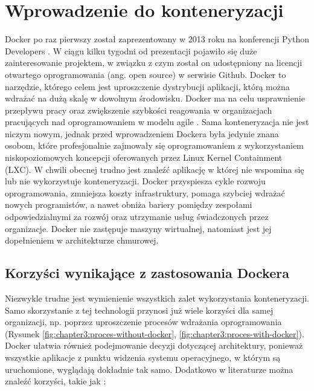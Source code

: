 \section{Wprowadzenie do konteneryzacji}
\label{sec:docker}
Docker po raz pierwszy został zaprezentowany w 2013 roku na konferencji Python Developers \cite{bernstein2014containers}. W ciągu kilku tygodni od prezentacji pojawiło się duże zainteresowanie projektem, w związku z czym został on udostępniony na licencji otwartego oprogramowania (ang. open source) w serwisie Github. Docker to narzędzie, którego celem jest uproszczenie dystrybucji aplikacji, którą można wdrażać na dużą skalę w dowolnym środowisku. Docker ma na celu usprawnienie przepływu pracy oraz zwiększenie szybkości reagowania w organizacjach pracujących nad oprogramowaniem w modelu agile \cite{panthofer2019mastering}. Sama konteneryzacja nie jest niczym nowym, jednak przed wprowadzeniem Dockera \cite{anderson2015docker} była jedynie znana osobom, które profesjonalnie zajmowały się oprogramowaniem z wykorzystaniem niskopoziomowych koncepcji oferowanych przez Linux Kernel Containment (LXC). W chwili obecnej trudno jest znaleźć aplikację w której nie wspomina się lub nie wykorzystuje konteneryzacji. Docker przyspiesza cykle rozwoju oprogramowania, zmniejsza koszty infrastruktury, pomaga szybciej wdrażać nowych programistów, a nawet obniża bariery pomiędzy zespołami odpowiedzialnymi za rozwój oraz utrzymanie usług świadczonych przez organizacje. Docker nie zastępuje maszyny wirtualnej, natomiast jest jej dopełnieniem w architekturze chmurowej.


\subsection{Korzyści wynikające z zastosowania Dockera}
Niezwykle trudne jest wymienienie wszystkich zalet wykorzystania konteneryzacji. Samo skorzystanie z tej technologii przynosi już wiele korzyści dla samej organizacji, np. poprzez uproszczenie procesów wdrażania oprogramowania (Rysunek \ref{fig:chapter3:proces-without-docker}, \ref{fig:chapter3:proces-with-docker}). Docker ułatwia również podejmowanie decyzji dotyczącej architektury, ponieważ wszystkie aplikacje z punktu widzenia systemu operacyjnego, w którym są uruchomione, wyglądają dokładnie tak samo. Dodatkowo w literaturze można znaleźć korzyści, takie jak \cite{bernstein2014containers, chung2016using}:

